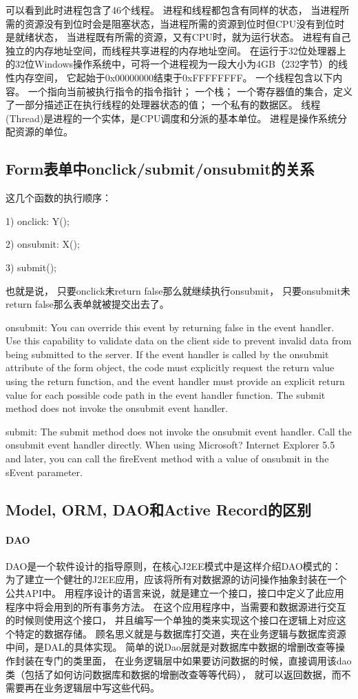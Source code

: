 \documentclass{book}
\begin{document}
可以看到此时进程包含了46个线程。
进程和线程都包含有同样的状态，
当进程所需的资源没有到位时会是阻塞状态，当进程所需的资源到位时但CPU没有到位时是就绪状态，
当进程既有所需的资源，又有CPU时，就为运行状态。
进程有自己独立的内存地址空间，而线程共享进程的内存地址空间。
在运行于32位处理器上的32位Windows操作系统中，可将一个进程视为一段大小为4GB（232字节）的线性内存空间，
它起始于0x00000000结束于0xFFFFFFFF。
一个线程包含以下内容。
一个指向当前被执行指令的指令指针；
一个栈；
一个寄存器值的集合，定义了一部分描述正在执行线程的处理器状态的值；
一个私有的数据区。
线程(Thread)是进程的一个实体，是CPU调度和分派的基本单位。
进程是操作系统分配资源的单位。

\subsection{Form表单中onclick/submit/onsubmit的关系}

这几个函数的执行顺序：

1) onclick: Y();

2) onsubmit: X();

3) submit();

也就是说，
只要onclick未return false那么就继续执行onsubmit，
只要onsubmit未return false那么表单就被提交出去了。

onsubmit:
You can override this event by returning false in the event handler.
Use this capability to validate data on the client side to prevent invalid data from being submitted to the server.
If the event handler is called by the onsubmit attribute of the form object,
the code must explicitly request the return value using the return function,
and the event handler must provide an explicit return value for each possible code path in the event handler function.
The submit method does not invoke the onsubmit event handler.
 
submit:
The submit method does not invoke the onsubmit event handler.
Call the onsubmit event handler directly.
When using Microsoft? Internet Explorer 5.5 and later,
you can call the fireEvent method with a value of onsubmit in the sEvent parameter.

\subsection{Model, ORM, DAO和Active Record的区别}

\paragraph{DAO}DAO是一个软件设计的指导原则，在核心J2EE模式中是这样介绍DAO模式的：
为了建立一个健壮的J2EE应用，应该将所有对数据源的访问操作抽象封装在一个公共API中。
用程序设计的语言来说，就是建立一个接口，接口中定义了此应用程序中将会用到的所有事务方法。
在这个应用程序中，当需要和数据源进行交互的时候则使用这个接口，
并且编写一个单独的类来实现这个接口在逻辑上对应这个特定的数据存储。
顾名思义就是与数据库打交道，夹在业务逻辑与数据库资源中间，是DAL的具体实现。
简单的说Dao层就是对数据库中数据的增删改查等操作封装在专门的类里面，
在业务逻辑层中如果要访问数据的时候，直接调用该dao类（包括了如何访问数据库和数据的增删改查等等代码），
就可以返回数据，而不需要再在业务逻辑层中写这些代码。
\end{document}
